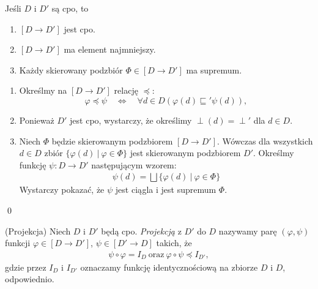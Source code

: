 \begin{twierdzenie}%
Jeśli \(D\) i \(D'\) są cpo, to
  \begin{enumerate}
     \item \([D\to D']\) jest cpo.
     \item \([D\to D']\) ma element najmniejszy.
     \item Każdy skierowany podzbiór \(\Phi \in [D\to D']\) ma supremum.
  \end{enumerate} 
\end{twierdzenie}
\begin{dowod}
  \begin{enumerate}
    \item 
      Określmy na \([D\to D']\) relację  \(\preceq\):
\[
\varphi \preceq \psi\quad \Leftrightarrow\quad \forall d\in D \left(\varphi(d) \sqsubseteq' \psi(d)\right),
\]
\item Ponieważ \(D'\) jest cpo, wystarczy, że określimy \(\perp(d)=\perp'\) dla \(d\in D\).
\item Niech \(\Phi\) będzie skierowanym podzbiorem \([D\to D']\). Wówczas dla wszystkich 
  \(d\in D\) zbiór \(\{\varphi(d)\ |\ \varphi\in\Phi\}\) jest skierowanym podzbiorem \(D'\). Określmy funkcję \(\psi: D\to D'\) następującym wzorem:
      \begin{align*}
        \psi(d) = \bigsqcup\{\varphi(d)\ |\ \varphi \in \Phi\}
      \end{align*}
      Wystarczy pokazać, że \(\psi\) jest ciągla i jest supremum \(\Phi\).
  \end{enumerate}\qed
\end{dowod}

\begin{definicja}(Projekcja)%
Niech \(D\) i \(D'\) będą cpo. \emph{Projekcją} z \(D'\) do \(D\) nazywamy parę \((\varphi, \psi)\) funkcji \(\varphi \in [D\to D']\), \(\psi \in [D'\to D]\) takich, że
\begin{align}
\psi\circ \varphi = I_D\ \text{oraz}\ \varphi\circ \psi \preceq I_{D'} \tag{\textasteriskcentered},
\end{align}
gdzie przez \(I_D\) i \(I_{D'}\) oznaczamy funkcję identycznościową na zbiorze \(D\) i \(D\), odpowiednio.
\end{definicja}

